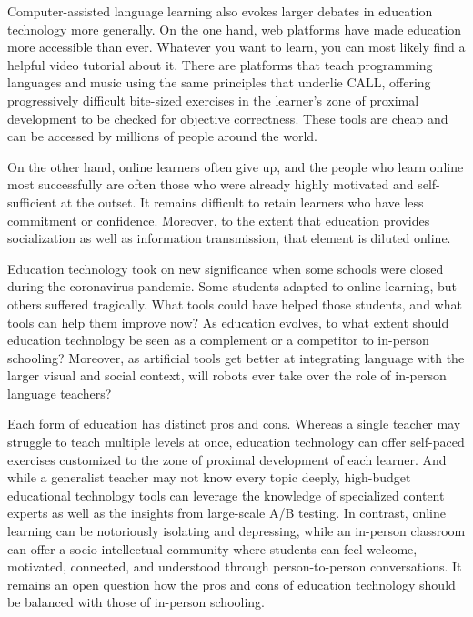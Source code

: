 Computer-assisted language learning also evokes larger debates in
education technology more generally.  On the one hand, web platforms
have made education more accessible than ever.  Whatever you want to
learn, you can most likely find a helpful video tutorial about it.
There are platforms that teach programming languages and music using
the same principles that underlie CALL,
offering progressively difficult bite-sized exercises in the learner's
zone of proximal development to be checked for objective correctness.
These tools are cheap and can be accessed by millions of people around
the world.

On the other hand, online learners often give up, and the people who
learn online most successfully are often those who were already highly
motivated and self-sufficient at the outset.  It remains difficult to
retain learners who have less commitment or confidence.  Moreover, to
the extent that education provides socialization as well as
information transmission, that element is diluted online.

Education technology took on new significance when some schools were closed
during the coronavirus pandemic.  Some students adapted to online
learning, but others suffered tragically.  What tools could have
helped those students, and what tools can help them improve now?  As
education evolves, to what extent should education technology be seen
as a complement or a competitor to in-person schooling?  Moreover, as artificial tools get better at integrating language with the larger visual and social context, will robots ever take over the role of in-person language teachers?

Each form of education has distinct pros and cons.  Whereas a single
teacher may struggle to teach multiple levels at once, education
technology can offer self-paced exercises customized to the zone of
proximal development of each learner.  And while a generalist teacher
may not know every topic deeply, high-budget educational technology
tools can leverage the knowledge of specialized content experts as
well as the insights from large-scale A/B testing.  In contrast,
online learning can be notoriously isolating and depressing, while an
in-person classroom can offer a socio-intellectual community where
students can feel welcome, motivated, connected, and understood
through person-to-person conversations.  It remains an open question
how the pros and cons of education technology should be balanced with
those of in-person schooling.



